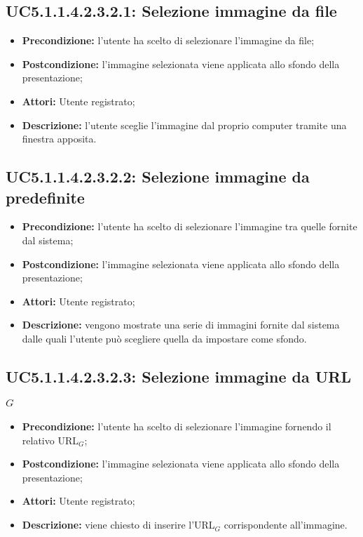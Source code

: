 \subsection{ UC5.1.1.4.2.3.2.1: Selezione immagine da file}

\begin{itemize}
	\item \textbf{Precondizione:} l’utente ha scelto di selezionare l’immagine da file;
	\item \textbf{Postcondizione:} l’immagine selezionata viene applicata allo sfondo della presentazione;
	\item \textbf{Attori:} Utente registrato;
	\item \textbf{Descrizione:} l’utente sceglie l’immagine dal proprio computer tramite una finestra apposita.
\end{itemize}
\subsection{ UC5.1.1.4.2.3.2.2: Selezione immagine da predefinite}

\begin{itemize}
	\item \textbf{Precondizione:} l’utente ha scelto di selezionare l’immagine tra quelle fornite dal sistema;
	\item \textbf{Postcondizione:} l’immagine selezionata viene applicata allo sfondo della presentazione;
	\item \textbf{Attori:} Utente registrato;
	\item \textbf{Descrizione:} vengono mostrate una serie di immagini fornite dal sistema dalle quali l’utente può scegliere quella da impostare come sfondo.
\end{itemize}
\subsection{ UC5.1.1.4.2.3.2.3: Selezione immagine da URL$_G$}

\begin{itemize}
	\item \textbf{Precondizione:} l’utente ha scelto di selezionare l’immagine fornendo il relativo URL$_G$;
	\item \textbf{Postcondizione:} l’immagine selezionata viene applicata allo sfondo della presentazione;
	\item \textbf{Attori:} Utente registrato;
	\item \textbf{Descrizione:} viene chiesto di inserire l’URL$_G$ corrispondente all’immagine.
\end{itemize}
